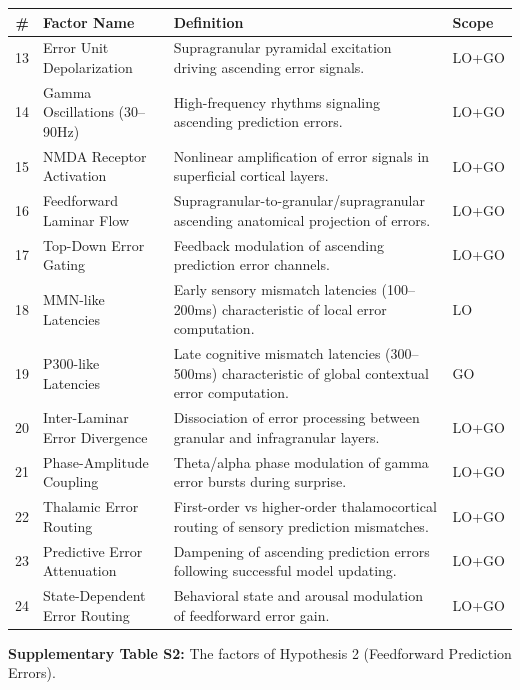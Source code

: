 \documentclass[12pt]{article}
\begin{document}
\vspace{1.2em}

\begingroup
\small
\noindent\begin{tabularx}{\textwidth}{@{}r p{1.6in} >{\raggedright\arraybackslash}X l@{}}
\toprule
\textbf{\#} & \textbf{Factor Name} & \textbf{Definition} & \textbf{Scope} \\
\midrule
13 & Error Unit Depolarization & Supragranular pyramidal excitation driving ascending error signals. & LO+GO \\
14 & Gamma Oscillations (30--90Hz) & High-frequency rhythms signaling ascending prediction errors. & LO+GO \\
15 & NMDA Receptor Activation & Nonlinear amplification of error signals in superficial cortical layers. & LO+GO \\
16 & Feedforward Laminar Flow & Supragranular-to-granular/supragranular ascending anatomical projection of errors. & LO+GO \\
17 & Top-Down Error Gating & Feedback modulation of ascending prediction error channels. & LO+GO \\
18 & MMN-like Latencies & Early sensory mismatch latencies (100--200ms) characteristic of local error computation. & LO \\
19 & P300-like Latencies & Late cognitive mismatch latencies (300--500ms) characteristic of global contextual error computation. & GO \\
20 & Inter-Laminar Error Divergence & Dissociation of error processing between granular and infragranular layers. & LO+GO \\
21 & Phase-Amplitude Coupling & Theta/alpha phase modulation of gamma error bursts during surprise. & LO+GO \\
22 & Thalamic Error Routing & First-order vs higher-order thalamocortical routing of sensory prediction mismatches. & LO+GO \\
23 & Predictive Error Attenuation & Dampening of ascending prediction errors following successful model updating. & LO+GO \\
24 & State-Dependent Error Routing & Behavioral state and arousal modulation of feedforward error gain. & LO+GO \\
\bottomrule
\end{tabularx}
\endgroup
\vspace{0.4em}

\noindent\textbf{Supplementary Table S2:} The factors of Hypothesis 2 (Feedforward Prediction Errors).
\end{document}
